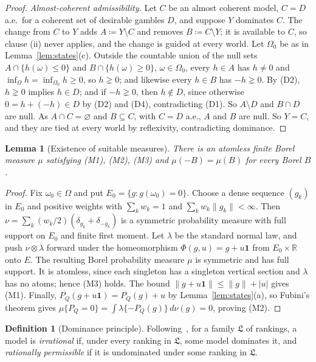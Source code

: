 \documentclass[11pt]{article}
\newtheorem{lemma}[theorem]{Lemma}
\theoremstyle{definition}
\newtheorem{definition}[theorem]{Definition}
\newcommand{\R}{\mathbb R}
\newcommand{\one}{\mathbf 1}
\newcommand{\Lf}{\mathfrak L}
\begin{document}
\begin{proof}
\emph{Almost-coherent admissibility.} Let $C$ be an almost coherent model, $C=D$ a.e.\ for a coherent set of desirable gambles $D$, and suppose $Y$ dominates $C$. The change from $C$ to $Y$ adds $A\coloneqq Y\setminus C$ and removes $B\coloneqq C\setminus Y$; it is available to $C$, so clause (ii) never applies, and the change is guided at every world. Let $\Omega_0$ be as in Lemma~\ref{lem:states}(c). Outside the countable union of the null sets $A\cap\{h(\omega)\le0\}$ and $B\cap\{h(\omega)\ge0\}$, $\omega\in\Omega_0$, every $h\in A$ has $h\ne0$ and $\inf_\Omega h=\inf_{\Omega_0}h\ge0$, so $h\gneq0$; and likewise every $h\in B$ has $-h\gneq0$. By (D2), $h\gneq0$ implies $h\in D$; and if $-h\gneq0$, then $h\notin D$, since otherwise $0=h+(-h)\in D$ by (D2) and (D4), contradicting (D1). So $A\setminus D$ and $B\cap D$ are null. As $A\cap C=\varnothing$ and $B\subseteq C$, with $C=D$ a.e., $A$ and $B$ are null. So $Y=C$, and they are tied at every world by reflexivity, contradicting dominance.
\end{proof}

\begin{lemma}[Existence of suitable measures]\label{lem:measure}
There is an atomless finite Borel measure $\mu$ satisfying (M1), (M2), (M3) and $\mu(-B)=\mu(B)$ for every Borel $B$.
\end{lemma}
\begin{proof}
Fix $\omega_0\in\Omega$ and put $E_0=\{g:g(\omega_0)=0\}$. Choose a dense sequence
$(g_k)$ in $E_0$ and positive weights with $\sum_k w_k=1$ and $\sum_k w_k\|g_k\|<\infty$.
Then $\nu=\sum_k(w_k/2)(\delta_{g_k}+\delta_{-g_k})$ is a symmetric probability measure
with full support on $E_0$ and finite first moment. Let $\lambda$ be the standard normal
law, and push $\nu\otimes\lambda$ forward under the homeomorphism
$\Phi(g,u)=g+u\one$ from $E_0\times\R$ onto $E$. The resulting Borel probability measure
$\mu$ is symmetric and has full support. It is atomless, since each singleton has a
singleton vertical section and $\lambda$ has no atoms; hence (M3) holds.
The bound $\|g+u\one\|\le\|g\|+|u|$ gives (M1). Finally,
$P_Q(g+u\one)=P_Q(g)+u$ by Lemma~\ref{lem:states}(a), so Fubini's theorem gives
$\mu\{P_Q=0\}=\int\lambda\{-P_Q(g)\}\,d\nu(g)=0$, proving (M2).
\end{proof}

\begin{definition}[Dominance principle]\label{def:principle}
Following~\cite{LDG}, for a family $\Lf$ of rankings, a model is \emph{irrational} if, under every ranking in $\Lf$, some model dominates it, and \emph{rationally permissible} if it is undominated under some ranking in $\Lf$.
\end{definition}
\end{document}
